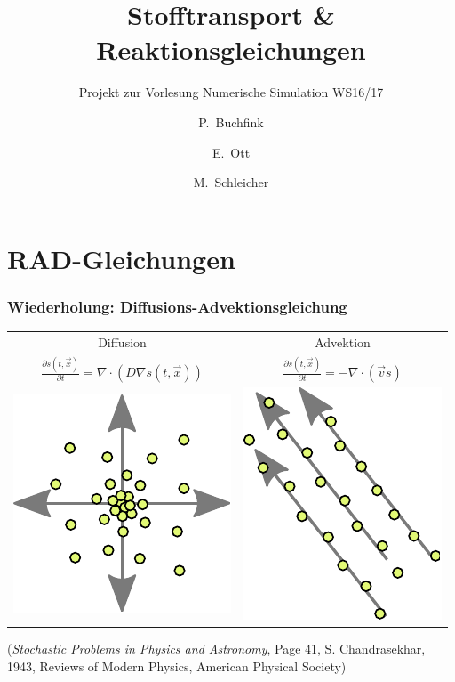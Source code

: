\documentclass[12pt]{beamer}
\title{Stofftransport \& Reaktionsgleichungen}
\subtitle{Projekt zur Vorlesung Numerische Simulation WS16/17}
\author{P.~Buchfink\inst{1} \and E.~Ott\inst{1} \and M.~Schleicher\inst{1}}
\institute
{
  \inst{1}
  Institut \\
  Universität Stuttgart
}
\begin{document}
  \begin{frame}
    \titlepage
  \end{frame}

  \section{RAD-Gleichungen}
    \begin{frame}
    \frametitle{Wiederholung: Diffusions-Advektionsgleichung}
    \begin{center}
    \begin{tabular}{ c c }
	Diffusion & Advektion \\
	$\frac{\partial s(t,\vec{x})}{\partial t} = \nabla \cdot (D \nabla s(t,\vec{x}))$
	&
	$\frac{\partial s(t,\vec{x})}{\partial t} = - \nabla \cdot (\vec{v}s)$
	\\
      \includegraphics[scale=0.5]{Bilder/diffusion.pdf}
	&
      \includegraphics[scale=0.5,angle=-90,origin=c]{Bilder/advection.pdf}
	\\
    \end{tabular}
    
    {\tiny (\emph{Stochastic Problems in Physics and Astronomy}, Page 41, S. Chandrasekhar, 1943, Reviews of Modern Physics, American Physical Society)}
    \end{center}
    \end{frame}
\end{document}
